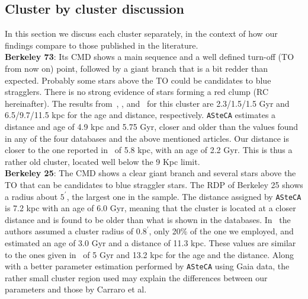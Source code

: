 \documentclass{aa}
\begin{document}
 \subsection{Cluster by cluster discussion}
  \label{ssec:indiv_clusters}

  In this section we discuss each cluster separately, in the context of how our
  findings compare to those published in the literature.\\

  \noindent \textbf{Berkeley 73}: Its CMD shows a main sequence and a well
  defined turn-off (TO from now on) point, followed by a giant branch that is a
  bit redder than expected. Probably some stars above the TO could be candidates
  to blue stragglers. There is no strong evidence of stars forming a red clump 
  (RC hereinafter).
  The results from~\cite{Ortolani_2005}, \cite{Carraro_2005},
  and~\cite{Carraro_2007_oldOC} for this cluster are 2.3/1.5/1.5 Gyr and
  6.5/9.7/11.5 kpc for the age and distance, respectively.
  \texttt{ASteCA} estimates a distance and age of 4.9 kpc and 5.75 Gyr,
  closer and older than the values found in any of the four databases and the
  above mentioned articles. Our distance is closer to the one reported
  in~\cite{Dias_2021} of 5.8 kpc, with an age of 2.2 Gyr. This is thus a
  rather old cluster, located well below the 9 Kpc limit.\\

  \textbf{Berkeley 25}: The CMD shows a clear giant branch and several stars
  above the TO that can be candidates to blue straggler stars. The RDP of
  Berkeley 25 shows a radius about $5^{\prime}$, the largest one in the sample.
  The distance assigned by \texttt{ASteCA} is 7.2 kpc with an age of 6.0 Gyr,
  meaning that the cluster is located at a closer distance and is found to be
  older than what is shown in the databases.
  In~\cite{Carraro_2005} the authors assumed a cluster radius of $0.8^{\prime}$,
  only 20\% of the one we employed, and estimated an age of 3.0 Gyr and a
  distance of 11.3 kpc. These values are similar to the ones given
  in~\cite{Carraro_2007_oldOC} of 5 Gyr and 13.2 kpc for the age and the
  distance.
  Along with a better parameter estimation performed by \texttt{ASteCA} using
  Gaia data, the rather small cluster region used may explain the differences
  between our parameters and those by Carraro et al.\\
\end{document}
